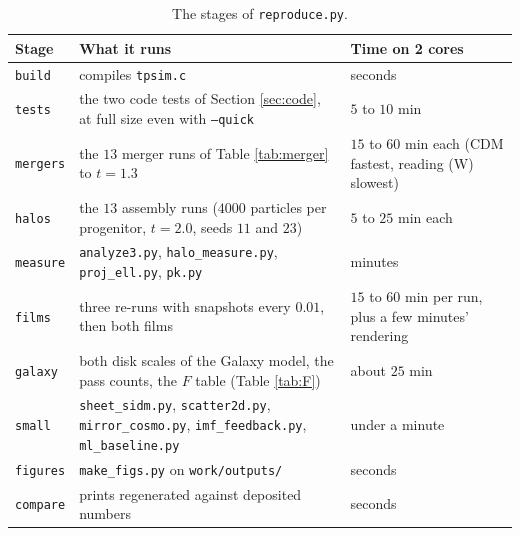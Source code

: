 \documentclass[11pt]{article}
\theoremstyle{definition}
\newcommand{\file}[1]{\texttt{#1}}
\begin{document}
\begin{table}[htbp]\centering\small
\begin{tabular}{@{}l>{\raggedright\arraybackslash}p{}>{\raggedright\arraybackslash}p{}@{}}
\toprule
Stage & What it runs & Time on 2 cores \\
\midrule
\texttt{build} & compiles \file{tpsim.c} & seconds \\
\texttt{tests} & the two code tests of Section \ref{sec:code}, at full size even with \texttt{--quick} & $5$ to $10$ min \\
\texttt{mergers} & the $13$ merger runs of Table \ref{tab:merger} to $t = 1.3$ & $15$ to $60$ min each (CDM fastest, reading (W) slowest) \\
\texttt{halos} & the $13$ assembly runs ($4000$ particles per progenitor, $t = 2.0$, seeds $11$ and $23$) & $5$ to $25$ min each \\
\texttt{measure} & \file{analyze3.py}, \file{halo\_measure.py}, \file{proj\_ell.py}, \file{pk.py} & minutes \\
\texttt{films} & three re-runs with snapshots every $0.01$, then both films & $15$ to $60$ min per run, plus a few minutes' rendering \\
\texttt{galaxy} & both disk scales of the Galaxy model, the pass counts, the $F$ table (Table \ref{tab:F}) & about $25$ min \\
\texttt{small} & \file{sheet\_sidm.py}, \file{scatter2d.py}, \file{mirror\_cosmo.py}, \file{imf\_feedback.py}, \file{ml\_baseline.py} & under a minute \\
\texttt{figures} & \file{make\_figs.py} on \file{work/outputs/} & seconds \\
\texttt{compare} & prints regenerated against deposited numbers & seconds \\
\bottomrule
\end{tabular}
\caption{The stages of \file{reproduce.py}.}
\label{tab:stages}
\end{table}
\end{document}
